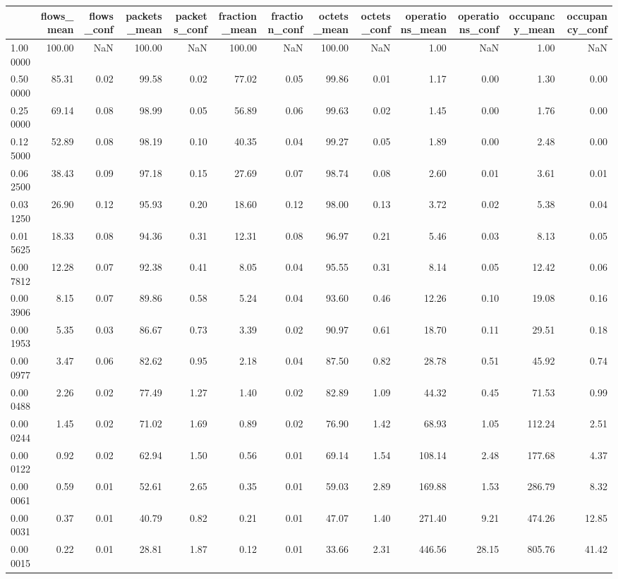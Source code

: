 \begin{tabular}{lrrrrrrrrrrrr}
\toprule
 & flows_mean & flows_conf & packets_mean & packets_conf & fraction_mean & fraction_conf & octets_mean & octets_conf & operations_mean & operations_conf & occupancy_mean & occupancy_conf \\
\midrule
1.000000 & 100.00 & NaN & 100.00 & NaN & 100.00 & NaN & 100.00 & NaN & 1.00 & NaN & 1.00 & NaN \\
0.500000 & 85.31 & 0.02 & 99.58 & 0.02 & 77.02 & 0.05 & 99.86 & 0.01 & 1.17 & 0.00 & 1.30 & 0.00 \\
0.250000 & 69.14 & 0.08 & 98.99 & 0.05 & 56.89 & 0.06 & 99.63 & 0.02 & 1.45 & 0.00 & 1.76 & 0.00 \\
0.125000 & 52.89 & 0.08 & 98.19 & 0.10 & 40.35 & 0.04 & 99.27 & 0.05 & 1.89 & 0.00 & 2.48 & 0.00 \\
0.062500 & 38.43 & 0.09 & 97.18 & 0.15 & 27.69 & 0.07 & 98.74 & 0.08 & 2.60 & 0.01 & 3.61 & 0.01 \\
0.031250 & 26.90 & 0.12 & 95.93 & 0.20 & 18.60 & 0.12 & 98.00 & 0.13 & 3.72 & 0.02 & 5.38 & 0.04 \\
0.015625 & 18.33 & 0.08 & 94.36 & 0.31 & 12.31 & 0.08 & 96.97 & 0.21 & 5.46 & 0.03 & 8.13 & 0.05 \\
0.007812 & 12.28 & 0.07 & 92.38 & 0.41 & 8.05 & 0.04 & 95.55 & 0.31 & 8.14 & 0.05 & 12.42 & 0.06 \\
0.003906 & 8.15 & 0.07 & 89.86 & 0.58 & 5.24 & 0.04 & 93.60 & 0.46 & 12.26 & 0.10 & 19.08 & 0.16 \\
0.001953 & 5.35 & 0.03 & 86.67 & 0.73 & 3.39 & 0.02 & 90.97 & 0.61 & 18.70 & 0.11 & 29.51 & 0.18 \\
0.000977 & 3.47 & 0.06 & 82.62 & 0.95 & 2.18 & 0.04 & 87.50 & 0.82 & 28.78 & 0.51 & 45.92 & 0.74 \\
0.000488 & 2.26 & 0.02 & 77.49 & 1.27 & 1.40 & 0.02 & 82.89 & 1.09 & 44.32 & 0.45 & 71.53 & 0.99 \\
0.000244 & 1.45 & 0.02 & 71.02 & 1.69 & 0.89 & 0.02 & 76.90 & 1.42 & 68.93 & 1.05 & 112.24 & 2.51 \\
0.000122 & 0.92 & 0.02 & 62.94 & 1.50 & 0.56 & 0.01 & 69.14 & 1.54 & 108.14 & 2.48 & 177.68 & 4.37 \\
0.000061 & 0.59 & 0.01 & 52.61 & 2.65 & 0.35 & 0.01 & 59.03 & 2.89 & 169.88 & 1.53 & 286.79 & 8.32 \\
0.000031 & 0.37 & 0.01 & 40.79 & 0.82 & 0.21 & 0.01 & 47.07 & 1.40 & 271.40 & 9.21 & 474.26 & 12.85 \\
0.000015 & 0.22 & 0.01 & 28.81 & 1.87 & 0.12 & 0.01 & 33.66 & 2.31 & 446.56 & 28.15 & 805.76 & 41.42 \\

\end{tabular}
